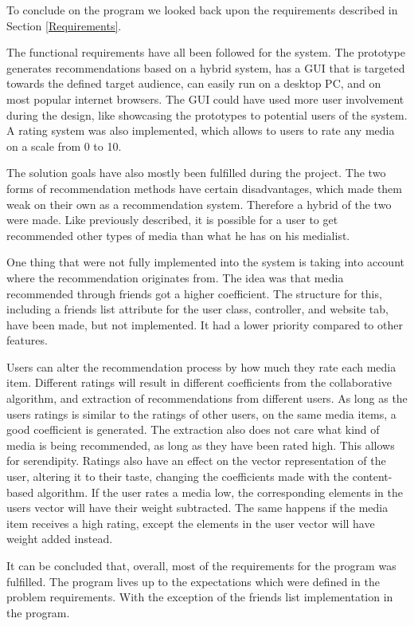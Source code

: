 To conclude on the program we looked back upon the requirements described in Section \ref{Requirements}.

The functional requirements have all been followed for the system. The prototype generates recommendations based on a hybrid system, has a GUI that is targeted towards the defined target audience, can easily run on a desktop PC, and on most popular internet browsers. The GUI could have used more user involvement during the design, like showcasing the prototypes to potential users of the system. A rating system was also implemented, which allows to users to rate any media on a scale from 0 to 10.

The solution goals have also mostly been fulfilled during the project. The two forms of recommendation methods have certain disadvantages, which made them weak on their own as a recommendation system. Therefore a hybrid of the two were made. Like previously described, it is possible for a user to get recommended other types of media than what he has on his medialist. 

One thing that were not fully implemented into the system is taking into account where the recommendation originates from. The idea was that media recommended through friends got a higher coefficient. The structure for this, including a friends list attribute for the user class, controller, and website tab, have been made, but not implemented. It had a lower priority compared to other features. 

Users can alter the recommendation process by how much they rate each media item. Different ratings will result in different coefficients from the collaborative algorithm, and extraction of recommendations from different users. As long as the users ratings is similar to the ratings of other users, on the same media items, a good coefficient is generated. The extraction also does not care what kind of media is being recommended, as long as they have been rated high. This allows for serendipity. Ratings also have an effect on the vector representation of the user, altering it to their taste, changing the coefficients made with the content-based algorithm. If the user rates a media low, the corresponding elements in the users vector will have their weight subtracted. The same happens if the media item receives a high rating, except the elements in the user vector will have weight added instead.

It can be concluded that, overall, most of the requirements for the program was fulfilled. The program lives up to the expectations which were defined in the problem requirements. With the exception of the friends list implementation in the program.